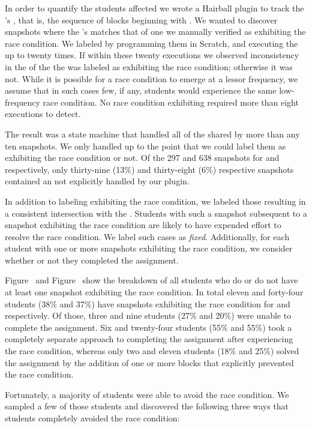 In order to quantify the students affected we wrote a Hairball plugin to track
the \net{}'s \exe{}, that is, the sequence of blocks beginning with
\netclicked{}. We wanted to discover snapshots where the \net{}'s \exe{}
matches that of one we manually verified as exhibiting the race condition. We
labeled  by programming them in Scratch, and executing the \sprogram{}
up to twenty times. If within these twenty executions we observed inconsistency
in the  of the \zebra{} the \exe{} was labeled as exhibiting the
race condition; otherwise it was not. While it is possible for a race condition
to emerge at a lessor frequency, we assume that in such cases few, if any,
students would experience the same low-frequency race condition. No race
condition exhibiting  required more than eight executions to detect.

The result was a state machine that handled all  of the \net{} shared by
more than any ten snapshots. We only handled  up to the point that we
could label them as exhibiting the race condition or not. Of the 297 and 638
snapshots for \sone{} and \stwo{} respectively, only thirty-nine (13\%) and
thirty-eight (6\%) respective snapshots contained an \exe{} not explicitly
handled by our plugin.

In addition to labeling  exhibiting the race condition, we labeled those
resulting in a consistent intersection with the \zebra{}. Students with such a
snapshot subsequent to a snapshot exhibiting the race condition are likely to
have expended effort to resolve the race condition. We label such cases as
\emph{fixed}. Additionally, for each student with one or more snapshots
exhibiting the race condition, we consider whether or not they completed the
assignment.

Figure~ and Figure~ show the breakdown
of all students who do or do not have at least one snapshot exhibiting the race
condition. In total eleven and forty-four students (38\% and 37\%) have
snapshots exhibiting the race condition for \sone{} and \stwo{}
respectively. Of those, three and nine students (27\% and 20\%) were unable to
complete the assignment. Six and twenty-four students (55\% and 55\%) took a
completely separate approach to completing the assignment after experiencing
the race condition, whereas only two and eleven students (18\% and 25\%) solved
the assignment by the addition of one or more blocks that explicitly prevented
the race condition.

Fortunately, a majority of students were able to avoid the race condition. We
sampled a few of those students and discovered the following three ways that
students completely avoided the race condition:

